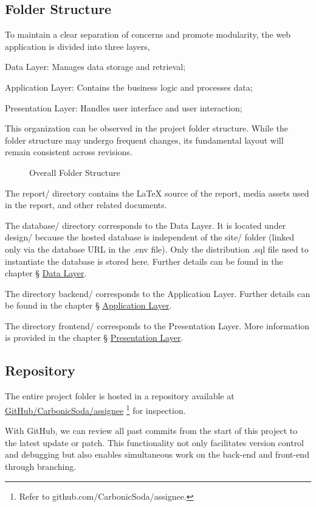 \documentclass[12pt]{report}
\newcommand{\n}{\par}
\newcommand{\br}{\n\vspace{1 em}\n}
\begin{document}
\subsection{Folder Structure} \label{overview.project-structure.folder-structure}
To maintain a clear separation of concerns and promote modularity, the web application is divided into three layers,\n
Data Layer: Manages data storage and retrieval;\n
Application Layer: Contains the business logic and processes data;\n
Presentation Layer: Handles user interface and user interaction;
\br
This organization can be observed in the project folder structure.
While the folder structure may undergo frequent changes, its fundamental layout will remain consistent across revisions.
\newpage
\begin{figure}[h!]
	\centering
	\begin{minipage}{0.3\linewidth}
	\end{minipage}
	\caption{Overall Folder Structure}
	\label{fig:overview-folder-structure}
\end{figure}
The report/ directory contains the \LaTeX{} source of the report, media assets used in the report, and other related documents.
\br
The database/ directory corresponds to the Data Layer.
It is located under design/ because the hosted database is independent of the site/ folder (linked only via the database URL in the .env file).
Only the distribution .sql file used to instantiate the database is stored here.
Further details can be found in the chapter \S{} \hyperref[data-layer]{Data Layer}.
\br
The directory backend/ corresponds to the Application Layer.
Further details can be found in the chapter \S{} \hyperref[application-layer]{Application Layer}.
\br
The directory frontend/ corresponds to the Presentation Layer.
More information is provided in the chapter \S{} \hyperref[presentation-layer]{Presentation Layer}.


\subsection{Repository} \label{overview.project-structure.repository}
The entire project folder is hosted in a repository available at
\href{https://github.com/CarbonicSoda/assignee}{GitHub/CarbonicSoda/assignee}
\footnote{Refer to github.com/CarbonicSoda/assignee.}
for inspection.
\br
With GitHub, we can review all past commits from the start of this project to the latest update or patch.
This functionality not only facilitates version control and debugging but also enables simultaneous work on the back-end and front-end through branching.
\end{document}
